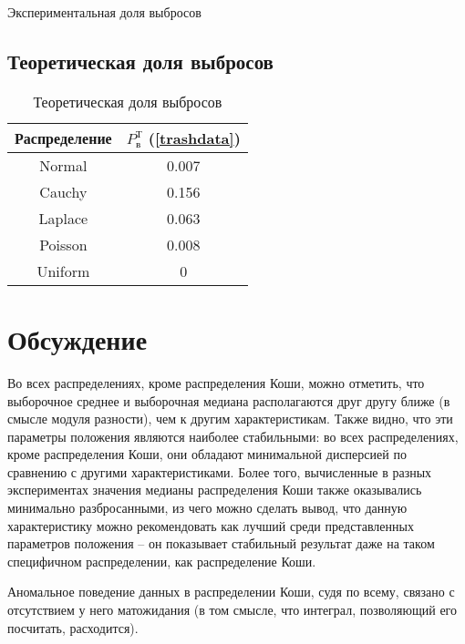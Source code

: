 \begin{table}[H]
	\begin{center}
		
		\caption{Экспериментальная доля выбросов}
		\label{tabl:tabl_name}
	\end{center}
\end{table}


\subsection{Теоретическая доля выбросов}

\begin{table}[H]
	\begin{center}
		\begin{tabular}{|c|c|}
			\hline			
			Распределение & $P_{\text{в}}^{\text{Т}}$ (\ref{trashdata})
			\\
			\hline			
			Normal & 0.007 \\
			\hline
			Cauchy & 0.156 \\
			\hline
			Laplace & 0.063 \\
			\hline			
			Poisson & 0.008 \\
			\hline		
			Uniform & 0 \\
			\hline			
		\end{tabular}
		\caption{Теоретическая доля выбросов}
		\label{tabl:tabl_name}
	\end{center}
\end{table}

\section{Обсуждение}

Во всех распределениях, кроме распределения Коши, можно отметить, что выборочное среднее и выборочная медиана располагаются друг другу ближе (в смысле модуля разности), чем к другим характеристикам. Также видно, что эти параметры положения являются наиболее стабильными: во всех распределениях, кроме распределения Коши, они обладают минимальной дисперсией по сравнению с другими характеристиками. Более того, вычисленные в разных экспериментах значения медианы распределения Коши также оказывались минимально разбросанными, из чего можно сделать вывод, что данную характеристику можно рекомендовать как лучший среди представленных параметров положения -- он показывает стабильный результат даже на таком специфичном распределении, как распределение Коши.

Аномальное поведение данных в распределении Коши, судя по всему, связано с отсутствием у него матожидания (в том смысле, что интеграл, позволяющий его посчитать, расходится).

